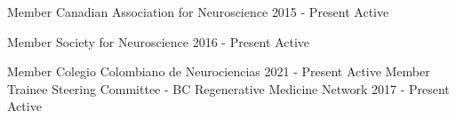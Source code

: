 

\begin{cvhonors}

  \cvhonor
    {Member} %
    {Canadian Association for Neuroscience} %
    {2015 - Present} %
    {Active} %

  \cvhonor
    {Member} %
    {Society for Neuroscience} %
    {2016 - Present} %
    {Active} %

  \cvhonor
    {Member} %
    {Colegio Colombiano de Neurociencias} %
    {2021 - Present} %
    {Active} %
  \cvhonor
    {Member} %
    {Trainee Steering Committee - BC Regenerative Medicine Network} %
    {2017 - Present} %
    {Active} %



\end{cvhonors}
